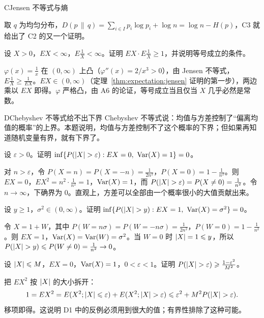 \begin{probleme}{C}{Jensen 不等式与熵}
\begin{questions}
\begin{solution}
取 $q$ 为均匀分布，$D(p\,\|\,q)=\sum_{i\in I}p_i\log p_i+\log n=\log n-H(p)$，C3 就给出了 C2 的又一个证明。
\end{solution}

\item 设 $X>0$，$EX<\infty$，$E\frac1X<\infty$。证明 $EX\cdot E\frac1X\geqslant1$，并说明等号成立的条件。
\begin{solution}
$\varphi(x)=\frac1x$ 在 $(0,\infty)$ 上凸（$\varphi''(x)=2/x^3>0$），由 Jensen 不等式，$E\frac1X\geqslant\frac1{EX}$。$EX\in(0,\infty)$（定理~\ref{thm:expectation:jensen} 证明的第一步），两边乘以 $EX$ 即得。$\varphi$ 严格凸，由 A6 的论证，等号成立当且仅当 $X$ 几乎必然是常数。
\end{solution}
\end{questions}
\end{probleme}

\thinkingpart

\begin{probleme}[问题]{D}{Chebyshev 不等式给不出下界}
Chebyshev 不等式说：均值与方差控制了“偏离均值的概率”的上界。本题说明，均值与方差控制不了这个概率的下界；但如果再知道随机变量有界，就有下界了。
\begin{questions}
\item 设 $\varepsilon>0$。证明 $\inf\{P(\abs X>\varepsilon):EX=0,\ \Var(X)=1\}=0$。
\begin{solution}
对 $n>\varepsilon$，令 $P(X=n)=P(X=-n)=\frac1{2n^2}$，$P(X=0)=1-\frac1{n^2}$。则 $EX=0$，$EX^2=n^2\cdot\frac1{n^2}=1$，$\operatorname{Var}(X)=1$，而 $P(\lvert X\rvert>\varepsilon)=P(X\neq0)=\frac1{n^2}$。令 $n\to\infty$，下确界为 $0$。直观上，方差可以全部由一个概率很小的大值贡献出来。
\end{solution}

\item 设 $y\geqslant1$，$\sigma^2\in(0,\infty)$。证明 $\inf\{P(\abs X>y):EX=1,\ \Var(X)=\sigma^2\}=0$。
\begin{solution}
令 $X=1+W$，其中 $P(W=n\sigma)=P(W=-n\sigma)=\frac1{2n^2}$，$P(W=0)=1-\frac1{n^2}$。则 $EX=1$，$\operatorname{Var}(X)=\operatorname{Var}(W)=\sigma^2$。当 $W=0$ 时 $\lvert X\rvert=1\leqslant y$，所以 $P(\lvert X\rvert>y)\leqslant P(W\neq0)=\frac1{n^2}\to0$。
\end{solution}

\item 设 $\lvert X\rvert\leqslant M$，$EX=0$，$\operatorname{Var}(X)=1$，$0<\varepsilon<1$。证明 $P(\lvert X\rvert>\varepsilon)\geqslant\frac{1-\varepsilon^2}{M^2}$。
\begin{solution}
把 $EX^2$ 按 $\lvert X\rvert$ 的大小拆开：
\[
1=EX^2=E(X^2;\lvert X\rvert\leqslant\varepsilon)+E(X^2;\lvert X\rvert>\varepsilon)\leqslant\varepsilon^2+M^2P(\lvert X\rvert>\varepsilon).
\]
移项即得。这说明 D1 中的反例必须用到很大的值；有界性排除了这种可能。
\end{solution}
\end{questions}
\end{probleme}

